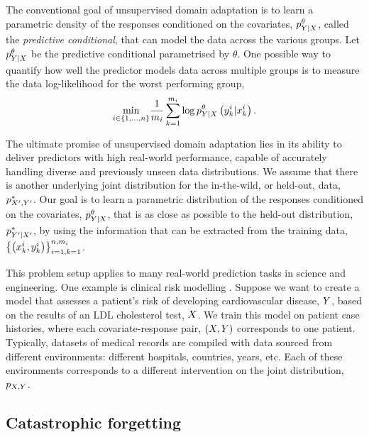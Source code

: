 \documentclass[../thesis.tex]{subfiles}
\begin{document}
The conventional goal of unsupervised domain adaptation is to learn a parametric density of the responses conditioned on the covariates, $\myfunc{p}^{\theta}_{\myrv{y} | \myrv{x}}$, called the \textit{predictive conditional}, that can model the data across the various groups. Let $\myfunc{p}^{\theta}_{\myrv{y} | \myrv{x}}$ be the predictive conditional parametrised by $\theta$. One possible way to quantify how well the predictor models data across multiple groups is to measure the data log-likelihood for the worst performing group,
\[
    \underset{i \in \{1,\dots,\mycnt{n}\}}{\mathrm{min}} \frac{1}{\mycnt{m}_i} \sum_{k=1}^{\mycnt{m}_i} \log \myfunc{p}^{\theta}_{\myrv{y} | \myrv{x}} \left( \myvect{y}^i_{k} | \myvect{x}^i_{k} \right).
\]

The ultimate promise of unsupervised domain adaptation lies in its ability to deliver predictors with high real-world performance, capable of accurately handling diverse and previously unseen data distributions. We assume that there is another underlying joint distribution for the in-the-wild, or held-out, data, $\myfunc{p}^{*}_{\myrv{x}', \myrv{y}'}$. Our goal is to learn a parametric distribution of the responses conditioned on the covariates, $\myfunc{p}^{\theta}_{\myrv{y} | \myrv{x}}$, that is as close as possible to the held-out distribution, $\myfunc{p}^{*}_{\myrv{y}' | \myrv{x}'}$, by using the information that can be extracted from the training data, $\left\{\left(x^i_{k},y^i_{k}\right)\right\}_{i=1, k=1}^{n, m_i}$.

This problem setup applies to many real-world prediction tasks in science and engineering. One example is clinical risk modelling \citep{sharmaClinicalRiskPrediction2021}. Suppose we want to create a model that assesses a patient's risk of developing cardiovascular disease, $\myrv{y}$, based on the results of an LDL cholesterol test, $\myrv{x}$. We train this model on patient case histories, where each covariate-response pair, $(\myrv{x}, \myrv{y})$ corresponds to one patient. Typically, datasets of medical records are compiled with data sourced from different environments: different hospitals, countries, years, etc. Each of these environments corresponds to a different intervention on the joint distribution, $\myfunc{p}_{\myrv{x}, \myrv{y}}$.

\subsection{Catastrophic forgetting}
\end{document}
